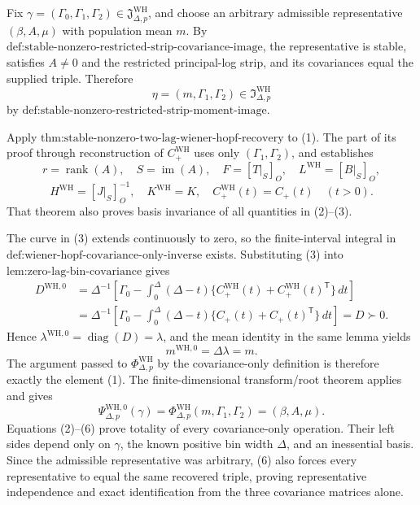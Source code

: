 Fix \(\gamma=(\Gamma_0,\Gamma_1,\Gamma_2)\in\mathfrak J_{\Delta,p}^{\mathrm{WH}}\), and choose an arbitrary admissible representative \((\beta,A,\mu)\) with population mean \(m\).  By \(\text{def:stable-nonzero-restricted-strip-covariance-image}\), the representative is stable, satisfies \(A\neq0\) and the restricted principal-log strip, and its covariances equal the supplied triple.  Therefore
\[
 \eta=(m,\Gamma_1,\Gamma_2)\in\mathfrak I_{\Delta,p}^{\mathrm{WH}}
\tag{1}
\]
by \(\text{def:stable-nonzero-restricted-strip-moment-image}\).

Apply \(\text{thm:stable-nonzero-two-lag-wiener-hopf-recovery}\) to (1).  The part of its proof through reconstruction of \(C_{+}^{\mathrm{WH}}\) uses only \((\Gamma_1,\Gamma_2)\), and establishes
\[
 r=\operatorname{rank}(A),\quad S=\operatorname{im}(A),\quad
 F=[T|_S]_O,\quad L^{\mathrm{WH}}=[B|_S]_O,
\tag{2}
\]
\[
 H^{\mathrm{WH}}=[J|_S]_O^{-1},\quad K^{\mathrm{WH}}=K,\quad
 C_{+}^{\mathrm{WH}}(t)=C_{+}(t)\quad(t>0).
\tag{3}
\]
That theorem also proves basis invariance of all quantities in (2)--(3).

The curve in (3) extends continuously to zero, so the finite-interval integral in \(\text{def:wiener-hopf-covariance-only-inverse}\) exists.  Substituting (3) into \(\text{lem:zero-lag-bin-covariance}\) gives
\[
 \begin{aligned}
 D^{\mathrm{WH},0}
 &=\Delta^{-1}\!\left[\Gamma_0-
 \int_0^\Delta(\Delta-t)
 \{C_{+}^{\mathrm{WH}}(t)+C_{+}^{\mathrm{WH}}(t)^{\mathsf T}\}\,dt\right]\\
 &=\Delta^{-1}\!\left[\Gamma_0-
 \int_0^\Delta(\Delta-t)
 \{C_{+}(t)+C_{+}(t)^{\mathsf T}\}\,dt\right]=D\succ0.
 \end{aligned}
\tag{4}
\]
Hence \(\lambda^{\mathrm{WH},0}=\operatorname{diag}(D)=\lambda\), and the mean identity in the same lemma yields
\[
 m^{\mathrm{WH},0}=\Delta\lambda=m.
\tag{5}
\]
The argument passed to \(\Phi_{\Delta,p}^{\mathrm{WH}}\) by the covariance-only definition is therefore exactly the element (1).  The finite-dimensional transform/root theorem applies and gives
\[
 \Psi_{\Delta,p}^{\mathrm{WH},0}(\gamma)
 =\Phi_{\Delta,p}^{\mathrm{WH}}(m,\Gamma_1,\Gamma_2)
 =(\beta,A,\mu).
\tag{6}
\]
Equations (2)--(6) prove totality of every covariance-only operation.  Their left sides depend only on \(\gamma\), the known positive bin width \(\Delta\), and an inessential basis.  Since the admissible representative was arbitrary, (6) also forces every representative to equal the same recovered triple, proving representative independence and exact identification from the three covariance matrices alone.